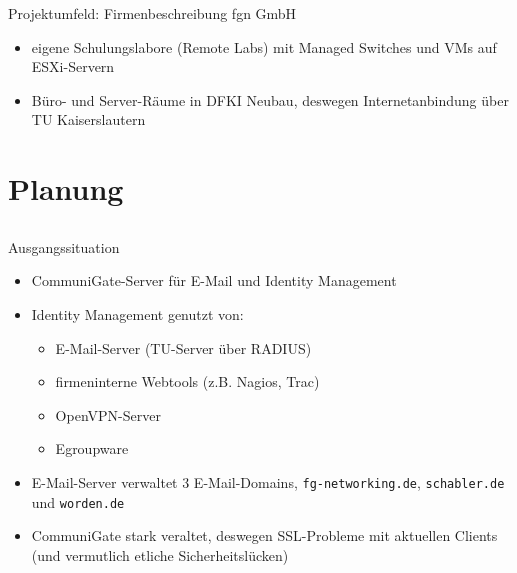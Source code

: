 \documentclass[handout,svgnames]{beamer}
\begin{document}
\begin{frame}{Projektumfeld: Firmenbeschreibung fgn GmbH}
\begin{itemize}
	\item eigene Schulungslabore (Remote Labs) mit Managed Switches und VMs auf ESXi-Servern
	\item Büro- und Server-Räume in DFKI Neubau, deswegen Internetanbindung über TU Kaiserslautern
\end{itemize}
\end{frame}


\section{Planung}
\subsection{}
\begin{frame}{Ausgangssituation}
\begin{itemize}
	\item CommuniGate-Server für E-Mail und Identity Management
	\item Identity Management genutzt von:
	\begin{itemize}
		\item E-Mail-Server (TU-Server über RADIUS)
		\item firmeninterne Webtools (z.B. Nagios, Trac)
		\item OpenVPN-Server
		\item Egroupware
	\end{itemize}
	\item E-Mail-Server verwaltet 3 E-Mail-Domains, \texttt{fg-networking.de}, \texttt{schabler.de} und \texttt{worden.de}
 	\item CommuniGate stark veraltet, deswegen SSL-Probleme mit aktuellen Clients (und vermutlich etliche Sicherheitslücken)
\end{itemize}
\end{frame}
\end{document}
